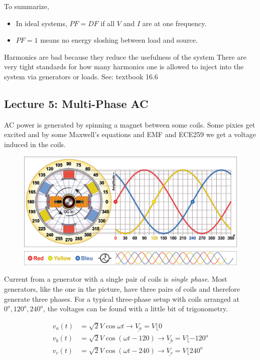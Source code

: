 \documentclass[10pt]{article}
\begin{document}
To summarize, 

\begin{itemize}
	\item In ideal systems, $ PF = DF $ if all $ V $ and $ I $ are at one frequency.
	\item $ PF = 1 $ means no energy sloshing between load and source.
\end{itemize}

Harmonics are bad because they reduce the usefulness of the system
There are very tight standards for how many harmonics one is allowed to inject into the system via generators or loads.
See: textbook 16.6




\subsection{Lecture 5: Multi-Phase AC}


AC power is generated by spinning a magnet between some coils.
Some pixies get excited and by some Maxwell's equations and EMF and ECE259 we get a voltage induced in the coils.

\begin{figure}[H]
	\centering
	\includegraphics[width=0.8\linewidth]{img/image_2022-09-17-21-36-37.png}
\end{figure}

Current from a generator with a single pair of coils is \textit{single phase}.
Most generators, like the one in the picture, have three pairs of coils and therefore generate three phases.
For a typical three-phase setup with coils arranged at $ 0^o, 120^o, 240^o $, the voltages can be found with a little bit of trigonometry.


\begin{equation}
	\begin{split}
		v_{a}(t) &= \sqrt{2} V \cos \omega t  \rightarrow \underline{V_{a}} = V \lfloor 0  \\
		v_{b}(t) &= \sqrt{2} V \cos( \omega t - 120) \rightarrow  \underline{V_{b}} = V \lfloor -120^o\\
		v_{c}(t) &= \sqrt{2} V \cos (\omega t - 240) \rightarrow \underline{V_{c}} = V \lfloor 240^o\\
	\end{split}
\end{equation}
\end{document}
